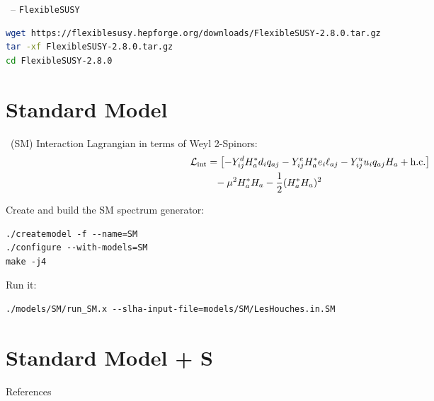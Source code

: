 \documentclass[11pt]{beamer}
\newcommand{\FlexibleSUSY}{\texttt{FlexibleSUSY}}
\newcommand{\hc}{\text{h.c.}}
\newcommand{\Lagrin}{\mathcal{L}_{\text{int}}}
\begin{document}
\begin{frame}[fragile]{\insertsection\ -- \FlexibleSUSY}
  \begin{lstlisting}[language=sh]
wget https://flexiblesusy.hepforge.org/downloads/FlexibleSUSY-2.8.0.tar.gz
tar -xf FlexibleSUSY-2.8.0.tar.gz
cd FlexibleSUSY-2.8.0\end{lstlisting}%
\end{frame}


\section{Standard Model}

\begin{frame}{\insertsection\ (SM)}
  Interaction Lagrangian in terms of Weyl 2-Spinors:
  \begin{align*}
    \Lagrin
    &= \qty[-Y^d_{ij} H_a^* d_iq_{aj} - Y^e_{ij} H_a^* e_i\ell_{aj} - Y^u_{ij} u_iq_{aj}H_a + \hc] \\
    &\phantom{=}{} -\mu^2 H_a^* H_a - \frac{1}{2} (H_a^* H_a)^2
  \end{align*}
\end{frame}


\begin{frame}[fragile]{\insertsection}
  Create and build the SM spectrum generator:
  \begin{lstlisting}
./createmodel -f --name=SM
./configure --with-models=SM
make -j4\end{lstlisting}
  Run it:
  \begin{lstlisting}
./models/SM/run_SM.x --slha-input-file=models/SM/LesHouches.in.SM\end{lstlisting}

\end{frame}


\section{Standard Model + S}

\begin{frame}{\insertsection}
\end{frame}


\begin{frame}[allowframebreaks]{References}
  \printbibliography
\end{frame}
\end{document}
